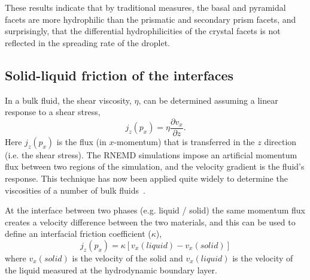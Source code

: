 \documentclass[aps,jcp,preprint,showpacs,superscriptaddress,groupedaddress]{revtex4}  %
\begin{document}
These results indicate that by traditional measures, the basal and
pyramidal facets are more hydrophilic than the prismatic and secondary
prism facets, and surprisingly, that the differential hydrophilicities
of the crystal facets is not reflected in the spreading rate of the
droplet.


\subsection{Solid-liquid friction of the interfaces}
In a bulk fluid, the shear viscosity, $\eta$, can be determined
assuming a linear response to a shear stress,
\begin{equation}\label{Shenyu-11}
j_{z}(p_{x}) = \eta \frac{\partial v_{x}}{\partial z}.
\end{equation}
Here $j_{z}(p_{x})$ is the flux (in $x$-momentum) that is transferred
in the $z$ direction (i.e. the shear stress). The RNEMD simulations
impose an artificial momentum flux between two regions of the
simulation, and the velocity gradient is the fluid's response. This
technique has now been applied quite widely to determine the
viscosities of a number of bulk fluids~\cite{Muller99,Bordat02,Cavalcanti07}.

At the interface between two phases (e.g. liquid / solid) the same
momentum flux creates a velocity difference between the two materials,
and this can be used to define an interfacial friction coefficient
($\kappa$),
\begin{equation}\label{Shenyu-13}
j_{z}(p_{x}) = \kappa \left[ v_{x}(liquid) - v_{x}(solid) \right]
\end{equation}
where $v_{x}(solid)$ is the velocity of the solid and $v_{x}(liquid)$
is the velocity of the liquid measured at the hydrodynamic boundary
layer.
\end{document}
